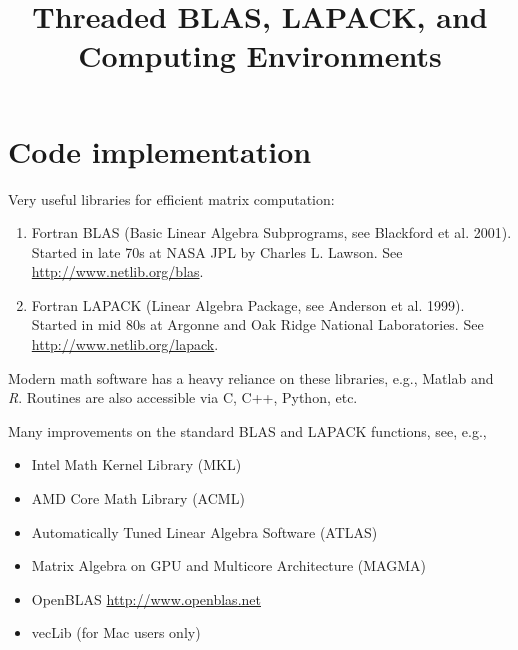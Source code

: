 \documentclass[10pt, xcolor=table]{beamer}
\title[]{Threaded BLAS, LAPACK, and Computing Environments}
\begin{document}
\begin {frame}
  \titlepage
\end{frame}



\section{Code implementation}
\begin{frame}
Very useful libraries for efficient matrix computation:
\begin{enumerate}\setlength{\itemsep}{0.3cm}
\item Fortran BLAS (Basic Linear Algebra Subprograms, see Blackford et al. 2001). Started in late 70s at NASA JPL by Charles L. Lawson. See \url{http://www.netlib.org/blas}.
\item Fortran LAPACK (Linear Algebra Package, see Anderson et al. 1999). Started in mid 80s at Argonne and Oak Ridge National Laboratories. See \url{http://www.netlib.org/lapack}.
\end{enumerate}

\vspace{0.5cm}

Modern math software has a heavy reliance on these libraries, e.g., Matlab and \emph{R}. Routines are also accessible via C, C++, Python, etc.
\end{frame}

\begin{frame}
Many improvements on the standard BLAS and LAPACK functions, see, e.g.,

\begin{itemize}\setlength{\itemsep}{0.4cm}
\item Intel Math Kernel Library (MKL)
\item AMD Core Math Library (ACML)
\item Automatically Tuned Linear Algebra Software (ATLAS)
\item Matrix Algebra on GPU and Multicore Architecture (MAGMA)
\item OpenBLAS \url{http://www.openblas.net}
\item vecLib (for Mac users only)
\end{itemize}

\end{frame}
\end{document}
